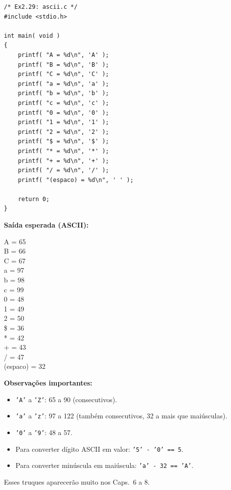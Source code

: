 \documentclass[12pt,a4paper]{article}
\begin{document}
\begin{respostabox}
\begin{lstlisting}
/* Ex2.29: ascii.c */
#include <stdio.h>

int main( void )
{
    printf( "A = %d\n", 'A' );
    printf( "B = %d\n", 'B' );
    printf( "C = %d\n", 'C' );
    printf( "a = %d\n", 'a' );
    printf( "b = %d\n", 'b' );
    printf( "c = %d\n", 'c' );
    printf( "0 = %d\n", '0' );
    printf( "1 = %d\n", '1' );
    printf( "2 = %d\n", '2' );
    printf( "$ = %d\n", '$' );
    printf( "* = %d\n", '*' );
    printf( "+ = %d\n", '+' );
    printf( "/ = %d\n", '/' );
    printf( "(espaco) = %d\n", ' ' );

    return 0;
}
\end{lstlisting}

\textbf{Saída esperada (ASCII):}
\begin{saida}
A = 65\\B = 66\\C = 67\\
a = 97\\b = 98\\c = 99\\
0 = 48\\1 = 49\\2 = 50\\
\$ = 36\\* = 42\\+ = 43\\/ = 47\\
(espaco) = 32
\end{saida}

\textbf{Observações importantes:}
\begin{itemize}[noitemsep]
  \item \texttt{'A'} a \texttt{'Z'}: 65 a 90 (consecutivos).
  \item \texttt{'a'} a \texttt{'z'}: 97 a 122 (também consecutivos, 32 a mais que maiúsculas).
  \item \texttt{'0'} a \texttt{'9'}: 48 a 57.
  \item Para converter dígito ASCII em valor: \texttt{'5' - '0' == 5}.
  \item Para converter minúscula em maiúscula: \texttt{'a' - 32 == 'A'}.
\end{itemize}
Esses truques aparecerão muito nos Caps.~6 a 8.
\end{respostabox}

\newpage

\end{document}
